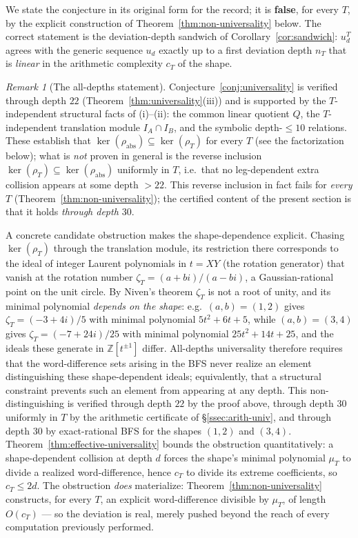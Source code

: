\documentclass[11pt,a4paper]{article}
\theoremstyle{remark}
\newtheorem{remark}[theorem]{Remark}
\theoremstyle{plain}
\begin{document}
We state the conjecture in its original form for the record; it is
\textbf{false}, for every $T$, by the explicit construction of
Theorem~\ref{thm:non-universality} below.  The correct statement is the
deviation-depth sandwich of Corollary~\ref{cor:sandwich}: $u_d^T$
agrees with the generic sequence $u_d$ exactly up to a first deviation
depth $n_T$ that is \emph{linear} in the arithmetic complexity $c_T$ of
the shape.

\begin{remark}[The all-depths statement]
\label{rem:univ-conj-status}
Conjecture~\ref{conj:universality} is verified through depth $22$
(Theorem~\ref{thm:universality}(iii)) and is supported by the
$T$-independent structural facts of (i)--(ii): the common linear quotient
$Q$, the $T$-independent translation module $I_A \cap I_B$, and the
symbolic depth-$\le 10$ relations.  These establish that
$\ker(\rho_{\mathrm{abs}}) \subseteq \ker(\rho_T)$ for every $T$ (see the
factorization below); what is \emph{not} proven in general is the reverse
inclusion $\ker(\rho_T) \subseteq \ker(\rho_{\mathrm{abs}})$ uniformly in
$T$, i.e.\ that no leg-dependent extra collision appears at some depth
$> 22$.  This reverse inclusion in fact fails for \emph{every} $T$
(Theorem~\ref{thm:non-universality}); the certified content of the
present section is that it holds \emph{through depth $30$}.

A concrete candidate obstruction makes the shape-dependence explicit.
Chasing $\ker(\rho_T)$ through the translation module, its restriction
there corresponds to the ideal of integer Laurent polynomials in
$t = XY$ (the rotation generator) that vanish at the rotation number
$\zeta_T = (a+bi)/(a-bi)$, a Gaussian-rational point on the unit circle.
By Niven's theorem $\zeta_T$ is not a root of unity, and its minimal
polynomial \emph{depends on the shape}: e.g.\ $(a,b)=(1,2)$ gives
$\zeta_T = (-3+4i)/5$ with minimal polynomial $5t^2 + 6t + 5$, while
$(a,b)=(3,4)$ gives $\zeta_T = (-7+24i)/25$ with minimal polynomial
$25t^2 + 14t + 25$, and the ideals these generate in
$\mathbb{Z}[t^{\pm 1}]$ differ.  All-depths universality therefore
requires that the word-difference sets arising in the BFS never realize
an element distinguishing these shape-dependent ideals; equivalently,
that a structural constraint prevents such an element from appearing at
any depth.  This non-distinguishing is verified through depth $22$ by
the proof above, through depth $30$ uniformly in $T$ by the arithmetic
certificate of \S\ref{ssec:arith-univ}, and through depth $30$ by
exact-rational BFS for the shapes $(1,2)$ and $(3,4)$.
Theorem~\ref{thm:effective-universality} bounds the obstruction
quantitatively: a shape-dependent collision at depth $d$ forces the
shape's minimal polynomial $\mu_T$ to divide a realized
word-difference, hence $c_T$ to divide its extreme coefficients, so
$c_T \le 2d$.  The obstruction \emph{does} materialize:
Theorem~\ref{thm:non-universality} constructs, for every $T$, an
explicit word-difference divisible by $\mu_T$, of length
$O(c_T)$ --- so the deviation is real, merely pushed beyond the reach
of every computation previously performed.
\end{remark}
\end{document}
